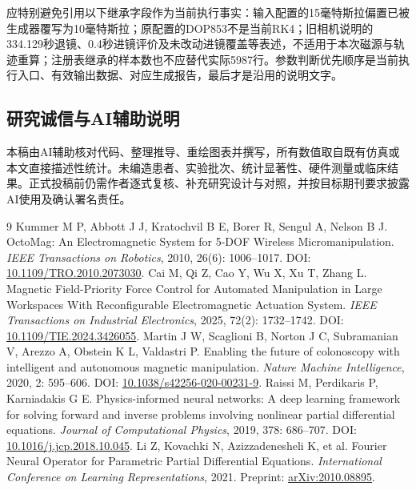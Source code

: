 \documentclass[UTF8,a4paper,zihao=5,fontset=windows]{ctexart}
\begin{document}
应特别避免引用以下继承字段作为当前执行事实：输入配置的15毫特斯拉偏置已被生成器覆写为10毫特斯拉；原配置的DOP853不是当前RK4；旧相机说明的334.129秒退镜、0.4秒进镜评价及未改动进镜覆盖等表述，不适用于本次磁源与轨迹重算；注册表继承的样本数也不应替代实际5987行。参数判断优先顺序是当前执行入口、有效输出数据、对应生成报告，最后才是沿用的说明文字。

\subsection*{研究诚信与AI辅助说明}
本稿由AI辅助核对代码、整理推导、重绘图表并撰写，所有数值取自既有仿真或本文直接描述性统计。未编造患者、实验批次、统计显著性、硬件测量或临床结果。正式投稿前仍需作者逐式复核、补充研究设计与对照，并按目标期刊要求披露AI使用及确认署名责任。

\clearpage
{}
\begin{thebibliography}{9}
Kummer M P, Abbott J J, Kratochvil B E, Borer R, Sengul A, Nelson B J.
OctoMag: An Electromagnetic System for 5-DOF Wireless Micromanipulation.
\textit{IEEE Transactions on Robotics}, 2010, 26(6): 1006--1017.
DOI: \href{https://doi.org/10.1109/TRO.2010.2073030}{10.1109/TRO.2010.2073030}.
Cai M, Qi Z, Cao Y, Wu X, Xu T, Zhang L.
Magnetic Field-Priority Force Control for Automated Manipulation in Large Workspaces With Reconfigurable Electromagnetic Actuation System.
\textit{IEEE Transactions on Industrial Electronics}, 2025, 72(2): 1732--1742.
DOI: \href{https://doi.org/10.1109/TIE.2024.3426055}{10.1109/TIE.2024.3426055}.
Martin J W, Scaglioni B, Norton J C, Subramanian V, Arezzo A, Obstein K L, Valdastri P.
Enabling the future of colonoscopy with intelligent and autonomous magnetic manipulation.
\textit{Nature Machine Intelligence}, 2020, 2: 595--606.
DOI: \href{https://doi.org/10.1038/s42256-020-00231-9}{10.1038/s42256-020-00231-9}.
Raissi M, Perdikaris P, Karniadakis G E.
Physics-informed neural networks: A deep learning framework for solving forward and inverse problems involving nonlinear partial differential equations.
\textit{Journal of Computational Physics}, 2019, 378: 686--707.
DOI: \href{https://doi.org/10.1016/j.jcp.2018.10.045}{10.1016/j.jcp.2018.10.045}.
Li Z, Kovachki N, Azizzadenesheli K, et al.
Fourier Neural Operator for Parametric Partial Differential Equations.
\textit{International Conference on Learning Representations}, 2021.
Preprint: \href{https://arxiv.org/abs/2010.08895}{arXiv:2010.08895}.
\end{thebibliography}
\end{document}
